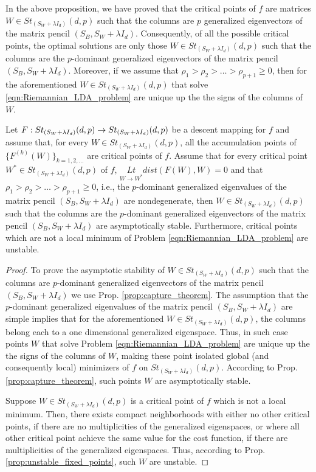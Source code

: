 \documentclass[11pt,a4paper]{article}
\begin{document}
\begin{remark}
In the above proposition, we have proved that the critical points of $f$ are matrices $W\in St_{(S_W+\lambda I_d)}(d,p)$ such that the columns are $p$ generalized eigenvectors of the matrix pencil $(S_B,S_W+\lambda I_d)$. Consequently, of all the possible critical points, the optimal solutions are only those $W\in St_{(S_W+\lambda I_d)}(d,p)$ such that the columns are the $p$-dominant generalized eigenvectors of the matrix pencil $(S_B,S_W+\lambda I_d)$. Moreover, if we assume that $\rho_1>\rho_2>\ldots>\rho_{p+1}\ge 0$, then for the aforementioned $W\in St_{(S_W+\lambda I_d)}(d,p)$ that solve \eqref{eqn:Riemannian_LDA_problem} are unique up the the signs of the columns of $W$.
\end{remark}

\begin{prop}
Let $F:St_{(S_W+\lambda I_d)}(d,p)\rightarrow St_{(S_W+\lambda I_d)}(d,p)$ be a descent mapping for $f$ and assume that, for every $W\in St_{(S_W+\lambda I_d)}(d,p)$, all the accumulation points of $\{F^{(k)}(W)\}_{k=1,2,\ldots}$ are critical points of $f$. Assume that for every critical point $W^*\in St_{(S_W+\lambda I_d)}(d,p)$ of $f$, $\underset{W\rightarrow W^*}{Lt}dist(F(W),W) = 0$ and that $\rho_1>\rho_2>\ldots>\rho_{p+1}\ge 0$, i.e., the $p$-dominant generalized eigenvalues of the matrix pencil $(S_B,S_W+\lambda I_d)$ are nondegenerate, then $W\in St_{(S_W+\lambda I_d)}(d,p)$ such that the columns are the $p$-dominant generalized eigenvectors of the matrix pencil $(S_B,S_W+\lambda I_d)$ are asymptotically stable. Furthermore, critical points which are not a local minimum of Problem \eqref{eqn:Riemannian_LDA_problem} are unstable.
\end{prop}

\begin{proof}
To prove the asymptotic stability of $W\in St_{(S_W+\lambda I_d)}(d,p)$ such that the columns are $p$-dominant generalized eigenvectors of the matrix pencil $(S_B, S_W + \lambda I_d)$ we use Prop. \ref{prop:capture_theorem}. The assumption that the $p$-dominant generalized eigenvalues of the matrix pencil $(S_B, S_W + \lambda I_d)$ are simple implies that for the aforementioned $W\in St_{(S_W+\lambda I_d)}(d,p)$, the columns belong each to a one dimensional generalized eigenspace. Thus, in such case points $W$ that solve Problem \eqref{eqn:Riemannian_LDA_problem} are unique up the the signs of the columns of $W$, making these point isolated global (and consequently local) minimizers of $f$ on $St_{(S_W+\lambda I_d)}(d,p)$. According to Prop. \ref{prop:capture_theorem}, such points $W$ are asymptotically stable.

Suppose $W\in St_{(S_W+\lambda I_d)}(d,p)$ is a critical point of $f$ which is not a local minimum. Then, there exists compact neighborhoods with either no other critical points, if there are no
multiplicities of the generalized eigenspaces, or where all other critical point achieve the same value for the cost function, if there are multiplicities of the generalized eigenspaces. Thus, according to Prop. \ref{prop:unstable_fixed_points}, such $W$ are unstable.
\end{proof}
\end{document}
